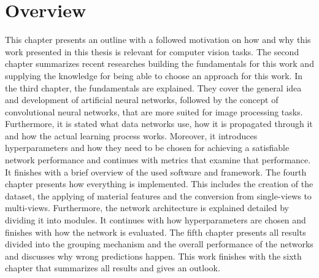 \section{Overview}
\label{sec:overview}
This chapter presents an outline with a followed motivation on how and why this work presented in this thesis is relevant for computer vision tasks.
The second chapter summarizes recent researches building the fundamentals for this work and supplying the knowledge for being able to choose an approach for this work.
In the third chapter, the fundamentals are explained.
They cover the general idea and development of artificial neural networks, followed by the concept of convolutional neural networks, that are more suited for image processing tasks.
Furthermore, it is stated what data networks use, how it is propagated through it and how the actual learning process works.
Moreover, it introduces hyperparameters and how they need to be chosen for achieving a satisfiable network performance and continues with metrics that examine that performance.
It finishes with a brief overview of the used software and framework.
The fourth chapter presents how everything is implemented.
This includes the creation of the dataset, the applying of material features and the conversion from single-views to multi-views.
Furthermore, the network architecture is explained detailed by dividing it into modules.
It continues with how hyperparameters are chosen and finishes with how the network is evaluated.
The fifth chapter presents all results divided into the grouping mechanism and the overall performance of the networks and discusses why wrong predictions happen.
This work finishes with the sixth chapter that summarizes all results and gives an outlook.
